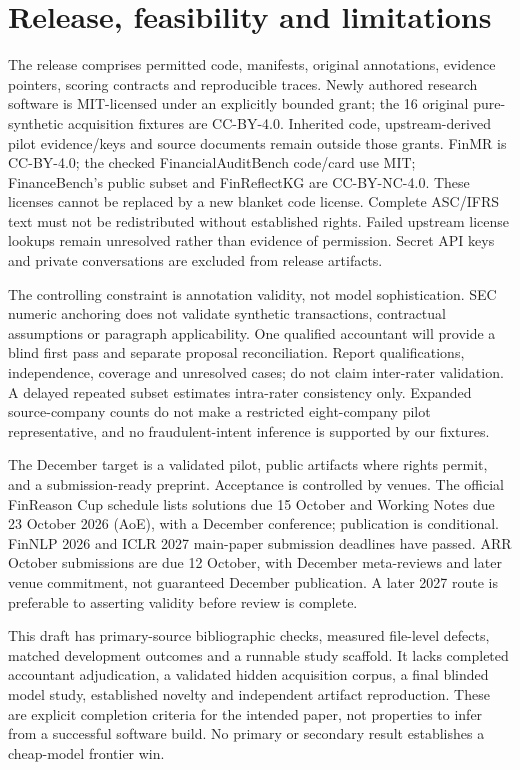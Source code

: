 \documentclass[11pt]{article}
\begin{document}
\section{Release, feasibility and limitations}
The release comprises permitted code, manifests, original annotations, evidence pointers, scoring contracts and reproducible traces. Newly authored research software is MIT-licensed under an explicitly bounded grant; the 16 original pure-synthetic acquisition fixtures are CC-BY-4.0. Inherited code, upstream-derived pilot evidence/keys and source documents remain outside those grants. FinMR is CC-BY-4.0; the checked FinancialAuditBench code/card use MIT; FinanceBench's public subset and FinReflectKG are CC-BY-NC-4.0. These licenses cannot be replaced by a new blanket code license. Complete ASC/IFRS text must not be redistributed without established rights. Failed upstream license lookups remain unresolved rather than evidence of permission. Secret API keys and private conversations are excluded from release artifacts.

The controlling constraint is annotation validity, not model sophistication. SEC numeric anchoring does not validate synthetic transactions, contractual assumptions or paragraph applicability. One qualified accountant will provide a blind first pass and separate proposal reconciliation. Report qualifications, independence, coverage and unresolved cases; do not claim inter-rater validation. A delayed repeated subset estimates intra-rater consistency only. Expanded source-company counts do not make a restricted eight-company pilot representative, and no fraudulent-intent inference is supported by our fixtures.

The December target is a validated pilot, public artifacts where rights permit, and a submission-ready preprint. Acceptance is controlled by venues. The official FinReason Cup schedule lists solutions due 15 October and Working Notes due 23 October 2026 (AoE), with a December conference; publication is conditional. FinNLP 2026 and ICLR 2027 main-paper submission deadlines have passed. ARR October submissions are due 12 October, with December meta-reviews and later venue commitment, not guaranteed December publication. A later 2027 route is preferable to asserting validity before review is complete.

This draft has primary-source bibliographic checks, measured file-level defects, matched development outcomes and a runnable study scaffold. It lacks completed accountant adjudication, a validated hidden acquisition corpus, a final blinded model study, established novelty and independent artifact reproduction. These are explicit completion criteria for the intended paper, not properties to infer from a successful software build. No primary or secondary result establishes a cheap-model frontier win.
\end{document}
